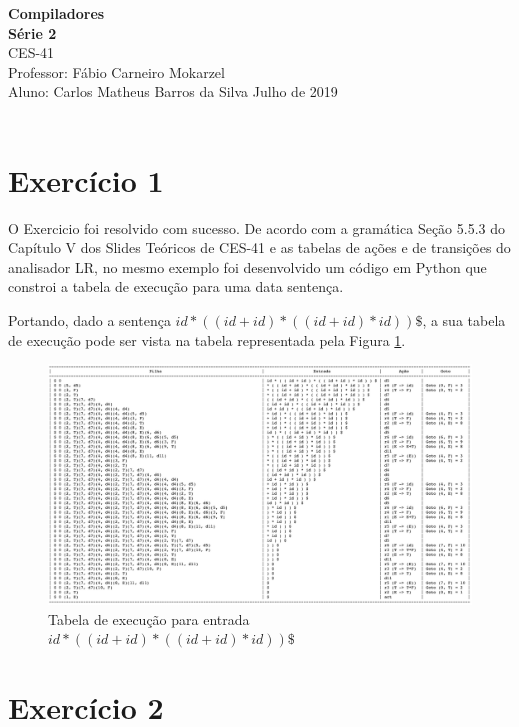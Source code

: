 \documentclass[a4paper, 10pt]{article}
\begin{document}
\noindent
\large
\textbf{Compiladores} \\
\textbf{Série 2} \\
\normalsize CES-41  \\
Professor: Fábio Carneiro Mokarzel \\
Aluno: Carlos Matheus Barros da Silva \hfill Julho de 2019 \\ \\



\section*{Exercício 1}

O Exercicio foi resolvido com sucesso. De acordo com a gramática Seção 5.5.3 do Capítulo V dos Slides Teóricos de CES-41 e as tabelas de ações e de transições do analisador LR, no mesmo exemplo foi desenvolvido um código em Python que constroi a tabela de execução para uma data sentença.

Portando, dado a sentença $id * ((id + id) * ((id + id) * id)) \$$, a sua tabela de execução pode ser vista na tabela representada pela Figura \ref{fig:tabela}.

\begin{figure}[H]
  \begin{center}
  \includegraphics[width=\linewidth]{./../tabela.png}
  \caption{Tabela de execução para entrada $id * ((id + id) * ((id + id) * id)) \$$}
  \label{fig:tabela}
  \end{center}
\end{figure}

\section*{Exercício 2}
\end{document}
